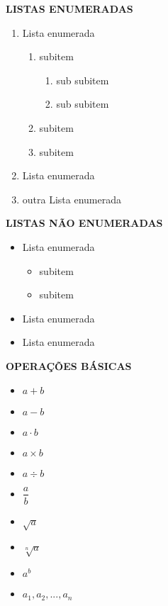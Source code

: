 \documentclass[12pt,a4paper]{article}
\begin{document}
    
    \textbf{LISTAS ENUMERADAS}
    
    \begin{enumerate}
        \item Lista enumerada
        \begin{enumerate}
            \item subitem
            \begin{enumerate}
                \item sub subitem
                \item sub subitem
            \end{enumerate}
            \item subitem
            \item subitem
        \end{enumerate}
        \item Lista enumerada
        \item outra Lista enumerada
    \end{enumerate}
    
    \textbf{LISTAS NÃO ENUMERADAS}
    
    \begin{itemize}
        \item Lista enumerada
        \begin{itemize}
            \item subitem
            \item subitem
        \end{itemize}
        \item Lista enumerada
        \item Lista enumerada
    \end{itemize}
    
    \textbf{OPERAÇÕES BÁSICAS}
    
    \begin{itemize}
        \item $a + b$
        \item $a - b$
        \item $a \cdot b$
        \item $a \times b$
        \item $a \div b$
        \item $\dfrac{a}{b}$
        \item $\sqrt{a}$
        \item $\sqrt[n]{a}$
        \item $a^{b}$
        \item $a_{1}, a_{2}, ..., a_{n}$
    \end{itemize}
    
\end{document}
